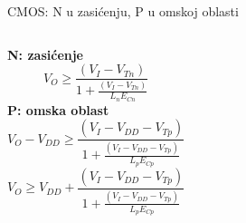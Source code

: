 \begin{frame}[label=09_2-s025]{CMOS: N u zasićenju, P u omskoj oblasti}
\begin{columns}[T,onlytextwidth]\centering {}\textbf{N: zasićenje}\[ V_O\ge\frac{(V_I-V_{Tn})}{1+\frac{(V_I-V_{Tn})}{L_nE_{Cn}}}\]
\textbf{P: omska oblast}\[ V_O-V_{DD}\ge\frac{(V_I-V_{DD}-V_{Tp})}{1+\frac{(V_I-V_{DD}-V_{Tp})}{L_pE_{Cp}}}\]
\[V_O\ge V_{DD}+\frac{(V_I-V_{DD}-V_{Tp})}{1+\frac{(V_I-V_{DD}-V_{Tp})}{L_pE_{Cp}}}\]
\end{columns}
\end{frame}
